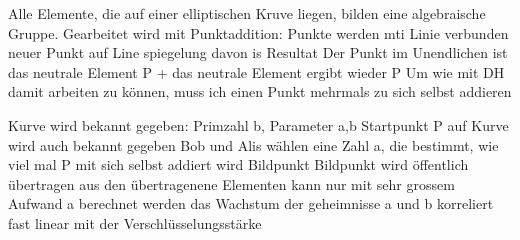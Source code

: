 \documentclass[ngerman,a4paper,12pt]{scrreprt}
\begin{document}
\ul
	\li Alle Elemente, die auf einer elliptischen Kruve liegen, bilden eine algebraische Gruppe.
	\li Gearbeitet wird mit Punktaddition:
		\ul
			\li Punkte werden mti Linie verbunden \ra neuer Punkt auf Line \ra spiegelung davon is Resultat
		\ulE
	\li Der Punkt im Unendlichen ist das neutrale Element
	\li P + das neutrale Element ergibt wieder P
	\li Um wie mit DH damit arbeiten zu können, muss ich einen Punkt mehrmals zu sich selbst addieren
\ulE
{}

\ul
	\li Kurve wird bekannt gegeben: Primzahl b, Parameter a,b
	\li Startpunkt P auf Kurve wird auch bekannt gegeben
	\li Bob und Alis wählen eine Zahl a, die bestimmt, wie viel mal P mit sich selbst addiert wird \ra Bildpunkt 
	\li Bildpunkt wird öffentlich übertragen
	\li aus den übertragenene Elementen kann nur mit sehr grossem Aufwand a berechnet werden
	\li das Wachstum der geheimnisse a und b korreliert fast linear mit der Verschlüsselungsstärke
\ulE
\end{document}
